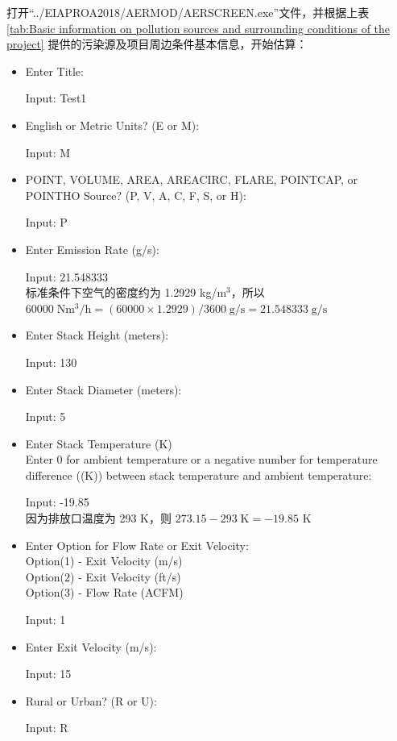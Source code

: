 \begin{framed}
\fangsong\footnotesize
\noindent 打开“../EIAPROA2018/AERMOD/AERSCREEN.exe”文件，并根据上表 \ref{tab:Basic information on pollution sources and surrounding conditions of the project} 提供的污染源及项目周边条件基本信息，开始估算：
\begin{itemize}[label=\textcolor{orange}{Prompt:}, align=left, leftmargin=*, itemsep=-0.5em]
    \item Enter Title:
    \item[Input:] Test1
    \item English or Metric Units? (E or M):
    \item[Input:] M
    \item POINT, VOLUME, AREA, AREACIRC, FLARE, POINTCAP, or POINTHO Source? (P, V, A, C, F, S, or H):
    \item[Input:] P
    \item Enter Emission Rate (g/s):
    \item[Input:] 21.548333 \\
    标准条件下空气的密度约为 1.2929 kg/m$^3$，所以 $60000 \;\mathrm{Nm^3/h} = (60000\times 1.2929)/3600 \;\mathrm{g/s} = 21.548333 \;\mathrm{g/s}$
    \item Enter Stack Height (meters):
    \item[Input:] 130
    \item Enter Stack Diameter (meters):
    \item[Input:] 5
    \item Enter Stack Temperature (K) \\
    Enter 0 for ambient temperature or a negative number for temperature
    difference ((K)) between stack temperature and ambient temperature:
    \item[Input:] -19.85 \\
    因为排放口温度为 293 K，则 $273.15-293 \;\text{K}=-19.85$ K
    \item Enter Option for Flow Rate or Exit Velocity: \\
    Option(1) - Exit Velocity (m/s) \\
    Option(2) - Exit Velocity (ft/s) \\
    Option(3) - Flow Rate (ACFM)
    \item[Input:] 1
    \item Enter Exit Velocity (m/s):
    \item[Input:] 15
    \item Rural or Urban? (R or U):
    \item[Input:] R

\end{itemize}
\end{framed}

